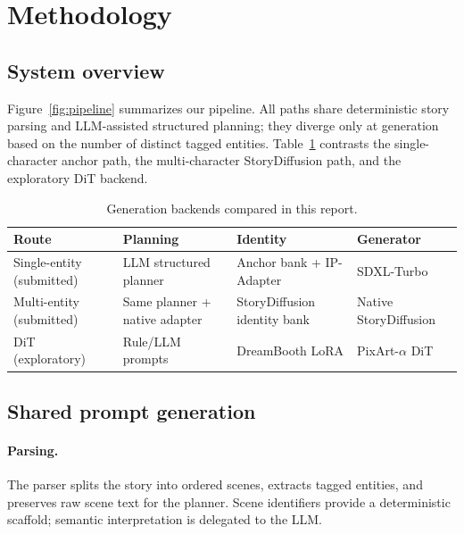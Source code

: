 \section{Methodology}
\label{sec:method}

\subsection{System overview}
Figure~\ref{fig:pipeline} summarizes our pipeline.
All paths share deterministic story parsing and LLM-assisted structured planning; they diverge only at generation based on the number of distinct tagged entities.
Table~\ref{tab:pipeline_comparison} contrasts the single-character anchor path, the multi-character StoryDiffusion path, and the exploratory DiT backend.

\begin{table}[!t]
  \centering
  \small
  \caption{Generation backends compared in this report.}
  \label{tab:pipeline_comparison}
  \begin{tabular}{p{}p{}p{}p{}}
    \toprule
    \textbf{Route} & \textbf{Planning} & \textbf{Identity} & \textbf{Generator} \\
    \midrule
    Single-entity (submitted) & LLM structured planner & Anchor bank + IP-Adapter & SDXL-Turbo \\
    Multi-entity (submitted) & Same planner + native adapter & StoryDiffusion identity bank & Native StoryDiffusion \\
    DiT (exploratory) & Rule/LLM prompts & DreamBooth LoRA & PixArt-$\alpha$ DiT \\
    \bottomrule
  \end{tabular}
\end{table}

\subsection{Shared prompt generation}
\label{sec:prompt}

\paragraph{Parsing.}
The parser splits the story into ordered scenes, extracts tagged entities, and preserves raw scene text for the planner.
Scene identifiers provide a deterministic scaffold; semantic interpretation is delegated to the LLM.

